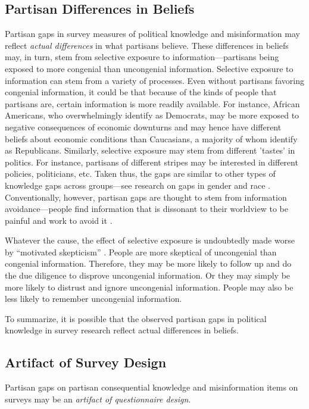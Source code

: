 \documentclass[12pt, letterpaper]{article}
\begin{document}
\subsection*{Partisan Differences in Beliefs}
Partisan gaps in survey measures of political knowledge and misinformation may reflect \emph{actual differences} in what partisans believe. These differences in beliefs may, in turn, stem from selective exposure to information---partisans being exposed to more congenial than uncongenial information. Selective exposure to information can stem from a variety of processes. Even without partisans favoring congenial information, it could be that because of the kinds of people that partisans are, certain information is more readily available. For instance, African Americans, who overwhelmingly identify as Democrats, may be more exposed to negative consequences of economic downturns and may hence have different beliefs about economic conditions than Caucasians, a majority of whom identify as Republicans. Similarly, selective exposure may stem from different 'tastes' in politics. For instance, partisans of different stripes may be interested in different policies, politicians, etc. Taken thus, the gaps are similar to other types of knowledge gaps across groups---see research on gaps in gender \citep{dolan2011women, barabas2014question} and race \citep{abrajano2015reexamining}. Conventionally, however, partisan gaps are thought to stem from information avoidance---people find information that is dissonant to their worldview to be painful and work to avoid it  \citep[e.g.,][]{abelson1959modes,festinger1962theory}.

Whatever the cause, the effect of selective exposure is undoubtedly made worse by ``motivated skepticism'' \citep{taber2006, stroud2008media}. People are more skeptical of uncongenial than congenial information. Therefore, they may be more likely to follow up and do the due diligence to disprove uncongenial information. Or they may simply be more likely to distrust and ignore uncongenial information. People may also be less likely to remember uncongenial information.

To summarize, it is possible that the observed partisan gaps in political knowledge in survey research reflect actual differences in beliefs.

\subsection*{Artifact of Survey Design}
Partisan gaps on partisan consequential knowledge and misinformation items on surveys may be an \emph{artifact of questionnaire design}. 
\end{document}
